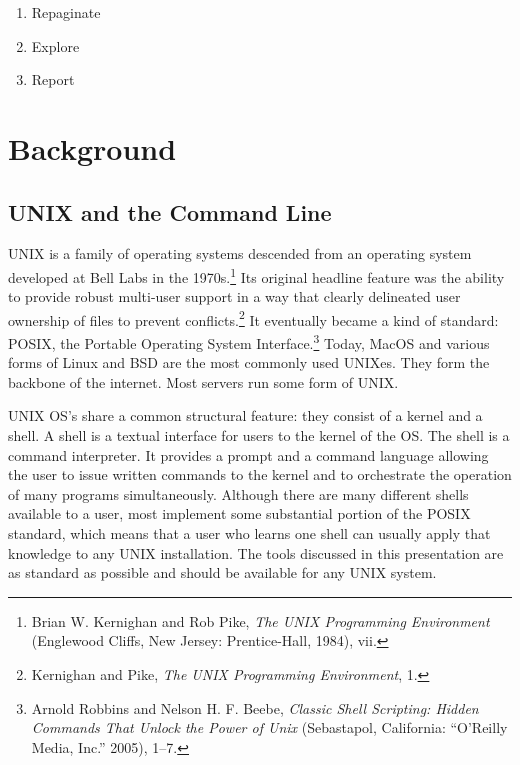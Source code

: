 \documentclass[
  letterpaper,
]{tufte-handout}
\providecommand{\tightlist}{%
  \setlength{\itemsep}{0pt}\setlength{\parskip}{0pt}}
\begin{document}
\begin{enumerate}
\def\labelenumi{\arabic{enumi}.}
\tightlist
\item
  Repaginate
\item
  Explore
\item
  Report
\end{enumerate}

\section{Background}\label{background}

\subsection{UNIX and the Command Line}\label{unix-and-the-command-line}

UNIX is a family of operating systems descended from an operating system
developed at Bell Labs in the 1970s.\footnote{Brian W. Kernighan and Rob
  Pike, \emph{The UNIX Programming Environment} (Englewood Cliffs, New
  Jersey: Prentice-Hall, 1984), vii.} Its original headline feature was
the ability to provide robust multi-user support in a way that clearly
delineated user ownership of files to prevent conflicts.\footnote{Kernighan
  and Pike, \emph{The UNIX Programming Environment}, 1.} It eventually
became a kind of standard: POSIX, the Portable Operating System
Interface.\footnote{Arnold Robbins and Nelson H. F. Beebe, \emph{Classic
  Shell Scripting: Hidden Commands That Unlock the Power of Unix}
  (Sebastapol, California: {``O'Reilly Media, Inc.''} 2005), 1--7.}
Today, MacOS and various forms of Linux and BSD are the most commonly
used UNIXes. They form the backbone of the internet. Most servers run
some form of UNIX.

UNIX OS's share a common structural feature: they consist of a kernel
and a shell. A shell is a textual interface for users to the kernel of
the OS. The shell is a command interpreter. It provides a prompt and a
command language allowing the user to issue written commands to the
kernel and to orchestrate the operation of many programs simultaneously.
Although there are many different shells available to a user, most
implement some substantial portion of the POSIX standard, which means
that a user who learns one shell can usually apply that knowledge to any
UNIX installation. The tools discussed in this presentation are as
standard as possible and should be available for any UNIX system.
\end{document}

